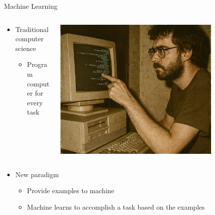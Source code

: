 \documentclass[11pt,table]{beamer}
\begin{document}
\begin{frame}{Machine Learning}

\begin{columns}[T]
\begin{column}{0.6\textwidth}
\begin{itemize}
    \item Traditional computer science
\begin{itemize}
    \item Program computer for every task \pause
\end{itemize}
\end{itemize}
\end{column}
\begin{column}{0.4\textwidth}
\centering
\includegraphics[width=0.8\textwidth]{figures/programmer}
\end{column}
\end{columns}\pause
    \begin{itemize}
        \item New paradigm
\begin{itemize}
    \item Provide examples to machine
\item Machine learns to accomplish a task based on the  examples
 
\end{itemize}

    \end{itemize}


\end{frame}
\end{document}
